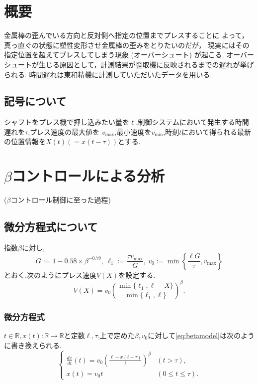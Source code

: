 \documentclass [dvipdfmx] {jsarticle}
\numberwithin{equation}{section}
\theoremstyle{definition} %
\theoremstyle{definition} %
\begin{document}
\section{概要}
金属棒の歪んでいる方向と反対側へ指定の位置までプレスすることに
よって，真っ直ぐの状態に塑性変形させ金属棒の歪みをとりたいのだが，
現実にはその指定位置を超えてプレスしてしまう現象 (オーバーシュート) が起こる.
オーバーシュートが生じる原因として，計測結果が歪取機に反映されるまでの遅れが挙げられる.
時間遅れは東和精機に計測していただいたデータを用いる.


\subsection{記号について}
シャフトをプレス機で押し込みたい量を$\ell$,制御システムにおいて発生する時間遅れを$\tau$,プレス速度の最大値を
$v_{\max}$,最小速度を$v_{\min}$,時刻$t$において得られる最新の位置情報を$X(t)(=x(t-\tau))$とする.


\section{$\beta$コントロールによる分析}
($\beta$コントロール制御に至った過程)


\subsection{微分方程式について}
指数$\beta$に対し,
\begin{equation}
    G:=1-0.58\times\beta^{-0.79},\ \ell_1:=\frac{\tau v_{\max}}{G},\ v_0:=\min\left\{\displaystyle\frac{\ell G}{\tau},v_{\max}\right\}
\end{equation}
とおく.次のようにプレス速度$V(X)$を設定する.
\begin{equation}\label{eq:betamodel}
    V(X)=v_0\left(\displaystyle\frac{\min\{\ell_1,\ell-X\}}{\min\{\ell_1,\ell\}}\right)^\beta.
\end{equation}


\subsubsection{微分方程式}
$t\in\mathbb{R},x(t)\colon\mathbb{R}\rightarrow\mathbb{R}$と定数$\ell,\tau$,上で定めた$\beta,v_0$に対して\eqref{eq:betamodel}は次のように書き換えられる.
\begin{equation}\label{betafomula}\begin{cases}
    \displaystyle\frac{dx}{dt}(t)=v_0\left(\frac{\ell-x(t-\tau)}{\ell}\right)^\beta &(t>\tau),\\
    x(t)=v_0 t &(0\le t \le \tau).
\end{cases}\end{equation}
\end{document}
